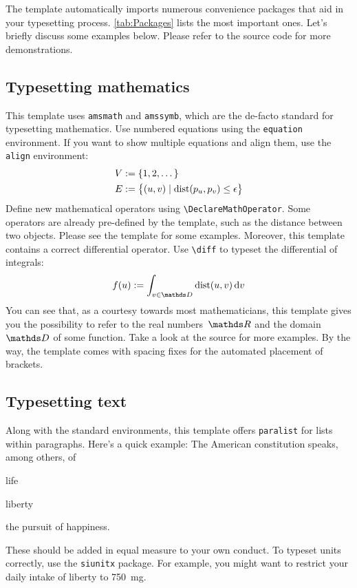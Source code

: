 The template automatically imports numerous convenience packages that
aid in your typesetting process. \autoref{tab:Packages} lists the
most important ones. Let's briefly discuss some examples below. Please
refer to the source code for more demonstrations.

\subsection{Typesetting mathematics}

This template uses \verb|amsmath| and \verb|amssymb|, which are the
de-facto standard for typesetting mathematics. Use numbered equations
using the \verb|equation| environment.
%
If you want to show multiple equations and align them, use the
\verb|align| environment:
%
\begin{align}
	V & := \{ 1, 2, \dots \}                                                            \\
	E & := \big\{ \left(u,v\right) \mid \dist\left(p_u, p_v\right) \leq \epsilon \big\}
\end{align}
%
Define new mathematical operators using \verb|\DeclareMathOperator|.
Some operators are already pre-defined by the template, such as the
distance between two objects. Please see the template for some examples.
%
Moreover, this template contains a correct differential operator. Use \verb|\diff| to typeset the differential of integrals:
%
\begin{equation}
	f(u) := \int_{v \in \domain}\dist(u,v)\diff{v}
\end{equation}
%
You can see that, as a courtesy towards most mathematicians, this
template gives you the possibility to refer to the real numbers~$\real$
and the domain~$\domain$ of some function. Take a look at the source for
more examples. By the way, the template comes with spacing fixes for the
automated placement of brackets.

\subsection{Typesetting text}

Along with the standard environments, this template offers
\verb|paralist| for lists within paragraphs.
%
Here's a quick example: The American constitution speaks, among others, of
%
\begin{inparaenum}[(i)]
	\item life
	\item liberty
	\item the pursuit of happiness.
\end{inparaenum}
%
These should be added in equal measure to your own conduct. To typeset
units correctly, use the \verb|siunitx| package. For example, you might
want to restrict your daily intake of liberty to \SI{750}{\milli\gram}.

